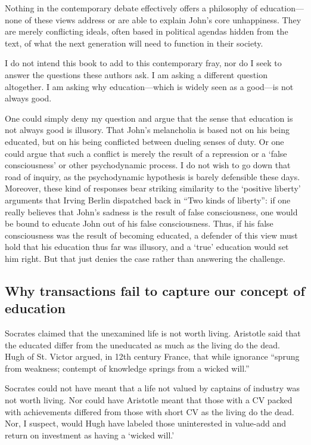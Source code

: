 Nothing in the contemporary debate effectively offers a philosophy of education---none of these views address or are able to explain John's core unhappiness. They are merely conflicting ideals, often based in political agendas hidden from the text, of what the next generation will need to function in their society. 

I do not intend this book to add to this contemporary fray, nor do I seek to answer the questions these authors ask. I am asking a different question altogether. I am asking why education---which is widely seen as a good---is not always good.

One could simply deny my question and argue that the sense that education is not always good is illusory. That John's melancholia is based not on his being educated, but on his being conflicted between dueling senses of duty. Or one could argue that such a conflict is merely the result of a repression or a `false consciousness' or other psychodynamic process. I do not wish to go down that road of inquiry, as the psychodynamic hypothesis is barely defensible these days. Moreover, these kind of responses bear striking similarity to the `positive liberty' arguments that Irving Berlin dispatched back in ``Two kinds of liberty'': if one really believes that John's sadness is the result of false consciousness, one would be bound to educate John out of his false consciousness. Thus, if his false consciousness was the result of becoming educated, a defender of this view must hold that his education thus far was illusory, and a `true' education would set him right. But that just denies the case rather than answering the challenge.

\subsection{Why transactions fail to capture our concept of education}
\label{whytransactionsfailtocaptureourconceptofeducation}

Socrates claimed that the unexamined life is not worth living. Aristotle said that the educated differ from the uneducated as much as the living do the dead.~\citep{Laertius:eqeg5o3J} Hugh of St. Victor argued, in 12th century France, that while ignorance ``sprung from weakness; contempt of knowledge springs from a wicked will.'' ~\citep[p. 43]{SaintVictor:1991vp}

Socrates could not have meant that a life not valued by captains of industry was not worth living. Nor could have Aristotle meant that those with a CV packed with achievements differed from those with short CV as the living do the dead. Nor, I suspect, would Hugh have labeled those uninterested in value-add and return on investment as having a `wicked will.' 

